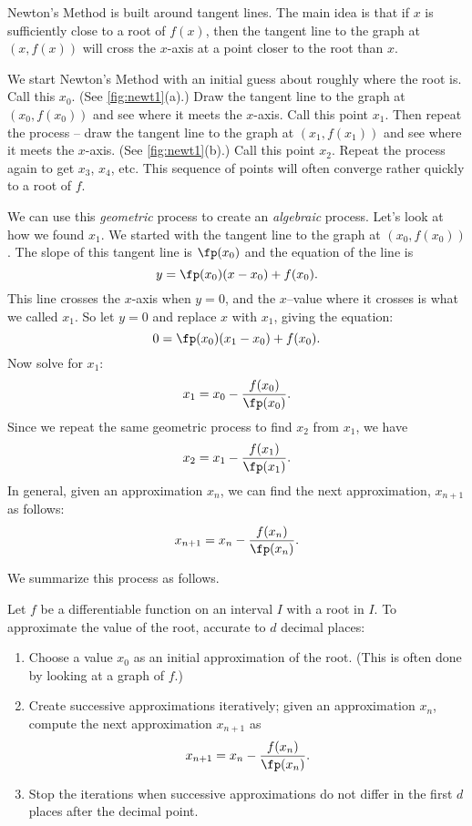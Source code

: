Newton's Method is built around tangent lines.  The main idea is that if $x$ is sufficiently close to a root of $f(x)$, then the  tangent line to the graph at $(x,f(x))$ will cross the $x$-axis at a point closer to the root than $x$.  

We start Newton's Method with an initial guess about roughly where the root is.  Call this $x_0$. (See \autoref{fig:newt1}(a).)  Draw the tangent line to the graph at $(x_0,f(x_0))$ and see where it meets the $x$-axis. Call this point $x_1$.  Then repeat the process -- draw the tangent line to the graph at $(x_1, f(x_1))$ and see where it meets the $x$-axis. (See \autoref{fig:newt1}(b).) Call this point $x_2$.  Repeat the process again to get $x_3$, $x_4$, etc.  This sequence of points will often converge rather quickly to a root of $f$.  

We can use this \textit{geometric} process to create an \textit{algebraic} process.  Let's look at how we found $x_1$.  We started with the tangent line to the graph at $(x_0,f(x_0))$.  The slope of this tangent line is $\fp(x_0)$ and the equation of the line is
\[y=\fp(x_0)(x-x_0)+f(x_0).\]
This line crosses the $x$-axis when $y=0$, and the $x$--value where it crosses is what we called $x_1$. So let $y=0$ and replace $x$ with $x_1$, giving the equation: 
\[ 0 = \fp(x_0)(x_1-x_0)+f(x_0).\] 
Now solve for $x_1$:
\[x_1=x_0-\frac{f(x_0)}{\fp(x_0)}.\]
Since we repeat the same geometric process to find $x_2$ from $x_1$, we have
\[x_2=x_1-\frac{f(x_1)}{\fp(x_1)}.\]
In general, given an approximation $x_n$, we can find the next approximation, $x_{n+1}$ as follows:
\[x_{n+1} = x_{n} - \frac{f(x_{n})}{\fp(x_{n})}.\]

We summarize this process as follows.

{Let $f$ be a differentiable function on an interval $I$ with a root in $I$. To approximate the value of the root, accurate to $d$ decimal places:
\begin{enumerate}
	\item		Choose a value $x_0$ as an initial approximation of the root. (This is often done by looking at a graph of $f$.)
	\item		Create successive approximations iteratively; given an approximation $x_n$, compute the next approximation $x_{n+1}$ as
	\[x_{n+1} = x_n - \frac{f(x_n)}{\fp(x_n)}.\]
	\item		Stop the iterations when successive approximations do not differ in the first $d$ places after the decimal point.
\end{enumerate}}

